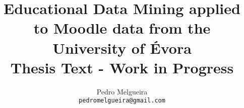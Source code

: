 \documentclass[12pt]{report}
\title{Educational Data Mining applied to Moodle data from the University of
Évora
\\
\large Thesis Text - Work in Progress}
\author{Pedro Melgueira\\
    \small{\texttt{pedromelgueira@gmail.com}}
}
\date{}
\begin{document}
\maketitle

\tableofcontents
\listoffigures
\listoftables





\printglossary



\end{document}
